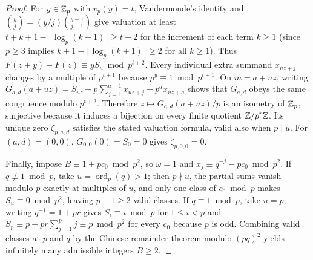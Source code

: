 \documentclass[11pt]{article}
\begin{document}
\begin{proof}
For $y\in\mathbb Z_p$ with $v_p(y)=t$, Vandermonde's identity and $\binom yj=(y/j)\binom{y-1}{j-1}$ give valuation at least $t+k+1-\lfloor\log_p(k+1)\rfloor\ge t+2$ for the increment of each term $k\ge1$ (since $p\ge3$ implies $k+1-\lfloor\log_p(k+1)\rfloor\ge2$ for all $k\ge1$). Thus $F(z+y)-F(z)\equiv yS_u\bmod p^{t+2}$. Every individual extra summand $x_{uz+j}$ changes by a multiple of $p^{t+1}$ because $\rho^y\equiv1\bmod p^{t+1}$. On $m=a+uz$, writing $G_{a,d}(a+uz)=S_{uz}+p\sum_{j=1}^{a-1}x_{uz+j}+p^d x_{uz+a}$ shows that $G_{a,d}$ obeys the same congruence modulo $p^{t+2}$. Therefore $z\mapsto G_{a,d}(a+uz)/p$ is an isometry of $\mathbb Z_p$, surjective because it induces a bijection on every finite quotient $\mathbb Z/p^r\mathbb Z$. Its unique zero $\zeta_{p,a,d}$ satisfies the stated valuation formula, valid also when $p\mid u$. For $(a,d)=(0,0)$, $G_{0,0}(0)=S_0=0$ gives $\zeta_{p,0,0}=0$.

Finally, impose $B\equiv1+pc_0\bmod p^2$, so $\omega=1$ and $x_j\equiv q^{-j}-pc_0\bmod p^2$. If $q\not\equiv1\bmod p$, take $u=\operatorname{ord}_p(q)>1$; then $p\nmid u$, the partial sums vanish modulo $p$ exactly at multiples of $u$, and only one class of $c_0\bmod p$ makes $S_u\equiv0\bmod p^2$, leaving $p-1\ge2$ valid classes. If $q\equiv1\bmod p$, take $u=p$; writing $q^{-1}=1+pr$ gives $S_i\equiv i\bmod p$ for $1\le i<p$ and $S_p\equiv p+pr\sum_{j=1}^p j\equiv p\bmod p^2$ for every $c_0$ because $p$ is odd. Combining valid classes at $p$ and $q$ by the Chinese remainder theorem modulo $(pq)^2$ yields infinitely many admissible integers $B\ge2$.
\end{proof}
\end{document}
